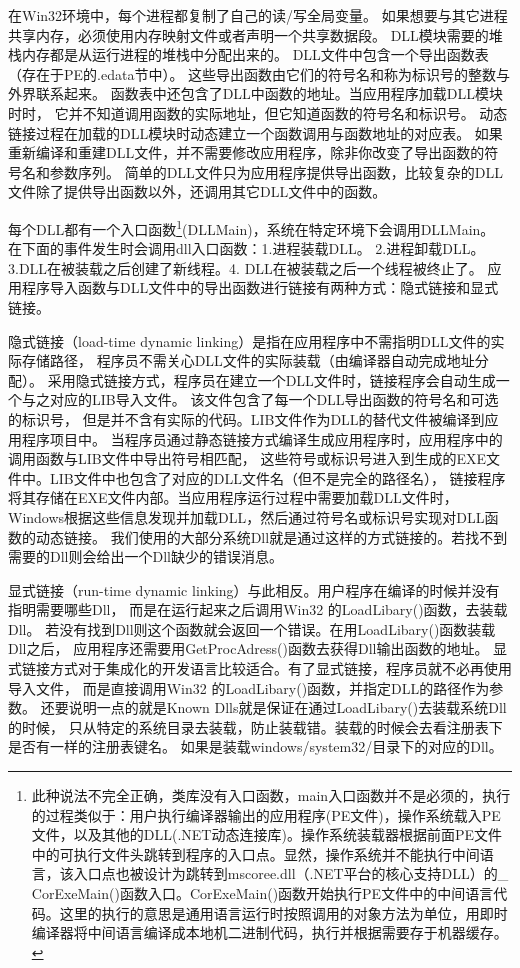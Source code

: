 \documentclass{book}
\begin{document}
在Win32环境中，每个进程都复制了自己的读/写全局变量。
如果想要与其它进程共享内存，必须使用内存映射文件或者声明一个共享数据段。
DLL模块需要的堆栈内存都是从运行进程的堆栈中分配出来的。
DLL文件中包含一个导出函数表（存在于PE的.edata节中）。
这些导出函数由它们的符号名和称为标识号的整数与外界联系起来。
函数表中还包含了DLL中函数的地址。当应用程序加载DLL模块时时，
它并不知道调用函数的实际地址，但它知道函数的符号名和标识号。
动态链接过程在加载的DLL模块时动态建立一个函数调用与函数地址的对应表。
如果重新编译和重建DLL文件，并不需要修改应用程序，除非你改变了导出函数的符号名和参数序列。
简单的DLL文件只为应用程序提供导出函数，比较复杂的DLL文件除了提供导出函数以外，还调用其它DLL文件中的函数。
         
每个DLL都有一个入口函数\footnote{此种说法不完全正确，类库没有入口函数，main入口函数并不是必须的，执行的过程类似于：用户执行编译器输出的应用程序(PE文件)，操作系统载入PE文件，以及其他的DLL(.NET动态连接库)。操作系统装载器根据前面PE文件中的可执行文件头跳转到程序的入口点。显然，操作系统并不能执行中间语言，该入口点也被设计为跳转到mscoree.dll（.NET平台的核心支持DLL）的\_ CorExeMain()函数入口。CorExeMain()函数开始执行PE文件中的中间语言代码。这里的执行的意思是通用语言运行时按照调用的对象方法为单位，用即时编译器将中间语言编译成本地机二进制代码，执行并根据需要存于机器缓存。}(DLLMain)，系统在特定环境下会调用DLLMain。
在下面的事件发生时会调用dll入口函数：1.进程装载DLL。
2.进程卸载DLL。3.DLL在被装载之后创建了新线程。4. DLL在被装载之后一个线程被终止了。
应用程序导入函数与DLL文件中的导出函数进行链接有两种方式：隐式链接和显式链接。
         
隐式链接（load-time dynamic linking）是指在应用程序中不需指明DLL文件的实际存储路径，
程序员不需关心DLL文件的实际装载（由编译器自动完成地址分配）。
采用隐式链接方式，程序员在建立一个DLL文件时，链接程序会自动生成一个与之对应的LIB导入文件。
该文件包含了每一个DLL导出函数的符号名和可选的标识号，
但是并不含有实际的代码。LIB文件作为DLL的替代文件被编译到应用程序项目中。
当程序员通过静态链接方式编译生成应用程序时，应用程序中的调用函数与LIB文件中导出符号相匹配，
这些符号或标识号进入到生成的EXE文件中。LIB文件中也包含了对应的DLL文件名（但不是完全的路径名），
链接程序将其存储在EXE文件内部。当应用程序运行过程中需要加载DLL文件时，
Windows根据这些信息发现并加载DLL，然后通过符号名或标识号实现对DLL函数的动态链接。
我们使用的大部分系统Dll就是通过这样的方式链接的。若找不到需要的Dll则会给出一个Dll缺少的错误消息。
         
显式链接（run-time dynamic linking）与此相反。用户程序在编译的时候并没有指明需要哪些Dll，
而是在运行起来之后调用Win32 的LoadLibary()函数，去装载Dll。
若没有找到Dll则这个函数就会返回一个错误。在用LoadLibary()函数装载Dll之后，
应用程序还需要用GetProcAdress()函数去获得Dll输出函数的地址。
显式链接方式对于集成化的开发语言比较适合。有了显式链接，程序员就不必再使用导入文件，
而是直接调用Win32 的LoadLibary()函数，并指定DLL的路径作为参数。
还要说明一点的就是Known Dlls就是保证在通过LoadLibary()去装载系统Dll的时候，
只从特定的系统目录去装载，防止装载错。装载的时候会去看注册表下是否有一样的注册表键名。
如果是装载windows/system32/目录下的对应的Dll。
\end{document}
